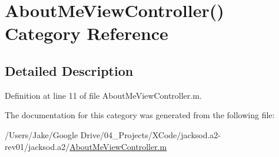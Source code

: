 \hypertarget{category_about_me_view_controller_07_08}{\section{About\+Me\+View\+Controller() Category Reference}
\label{category_about_me_view_controller_07_08}
}


\subsection{Detailed Description}


Definition at line 11 of file About\+Me\+View\+Controller.\+m.



The documentation for this category was generated from the following file\+:\begin{DoxyCompactItemize}
\item 
/\+Users/\+Jake/\+Google Drive/04\+\_\+\+Projects/\+X\+Code/jacksod.\+a2-\/rev01/jacksod.\+a2/\hyperlink{_about_me_view_controller_8m}{About\+Me\+View\+Controller.\+m}\end{DoxyCompactItemize}
